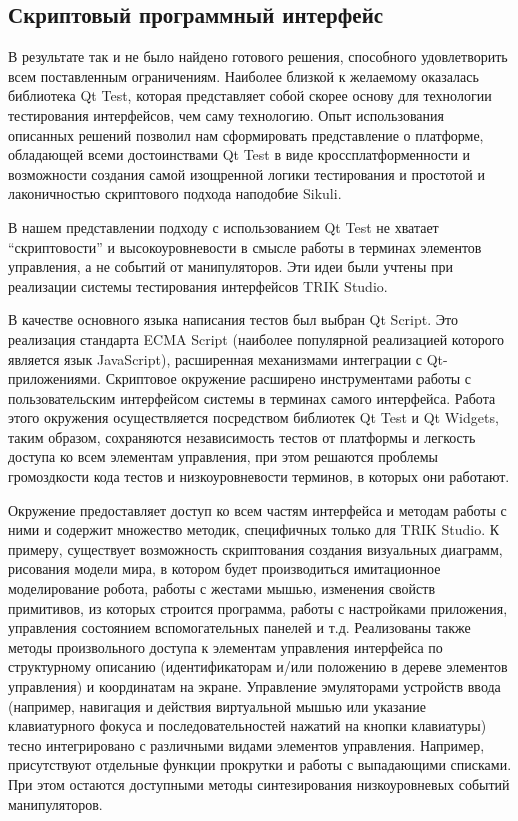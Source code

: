 ﻿\documentclass[conference]{IEEEtran}
\begin{document}
\subsection{Скриптовый программный интерфейс}
В результате так и не было найдено готового решения, способного удовлетворить всем 
поставленным ограничениям. Наиболее близкой к желаемому оказалась библиотека Qt Test, 
которая представляет собой скорее основу для технологии тестирования интерфейсов, чем 
саму технологию. Опыт использования описанных решений позволил нам сформировать представление 
о платформе, обладающей всеми достоинствами Qt Test в виде кроссплатформенности и 
возможности создания самой изощренной логики тестирования и простотой и лаконичностью 
скриптового подхода наподобие Sikuli.

В нашем представлении подходу с использованием Qt Test не хватает "`скриптовости"' и 
высокоуровневости в смысле работы в терминах элементов управления, а не событий от 
манипуляторов. Эти идеи были учтены при реализации системы тестирования интерфейсов TRIK Studio.

В качестве основного языка написания тестов был выбран Qt Script. Это реализация стандарта 
ECMA Script (наиболее популярной реализацией которого является язык JavaScript), расширенная 
механизмами интеграции с Qt-приложениями. Скриптовое окружение расширено инструментами 
работы с пользовательским интерфейсом системы в терминах самого интерфейса. Работа 
этого окружения осуществляется посредством библиотек Qt Test и Qt Widgets, таким образом, 
сохраняются независимость тестов от платформы и легкость доступа ко всем элементам 
управления, при этом решаются проблемы громоздкости кода тестов и низкоуровневости 
терминов, в которых они работают.

Окружение предоставляет доступ ко всем частям интерфейса и методам работы с ними и 
содержит множество методик, специфичных только для TRIK Studio. К примеру, существует 
возможность скриптования создания визуальных диаграмм, рисования модели мира, в котором 
будет производиться имитационное моделирование робота, работы с жестами мышью, изменения 
свойств примитивов, из которых строится программа, работы с настройками приложения, 
управления состоянием вспомогательных панелей и т.д. Реализованы также методы произвольного 
доступа к элементам управления интерфейса по структурному описанию (идентификаторам 
и/или положению в дереве элементов управления) и координатам на экране. Управление 
эмуляторами устройств ввода (например, навигация и действия виртуальной мышью или 
указание клавиатурного фокуса и последовательностей нажатий на кнопки клавиатуры) тесно 
интегрировано с различными видами элементов управления. Например, присутствуют отдельные 
функции прокрутки и работы с выпадающими списками. При этом остаются доступными методы 
синтезирования низкоуровневых событий манипуляторов. 
\end{document}
